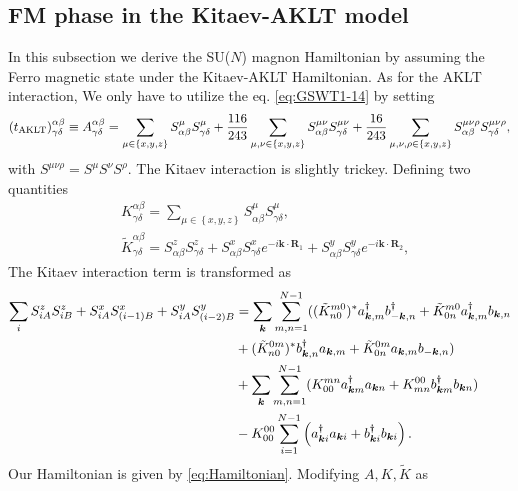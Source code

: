 \documentclass[11pt, aps, longbibliography]{article}
\begin{document}
\subsection{FM phase in the Kitaev-AKLT model}
In this subsection we derive the SU($N$) magnon Hamiltonian by assuming the Ferro magnetic state under the Kitaev-AKLT Hamiltonian.
As for the AKLT interaction, We only have to utilize the eq. \eqref{eq:GSWT1-14} by setting
\begin{equation}
    (t_{\rm AKLT})^{\alpha\beta}_{\gamma\delta}  \equiv A^{\alpha\beta}_{\gamma\delta} = \sum_{\mu\in \left\{ x,y,z \right\}} S^\mu_{\alpha\beta}S^\mu_{\gamma\delta} + \frac{116}{243}\sum_{\mu,\nu \in \left\{ x,y,z \right\}} S^{\mu\nu}_{\alpha\beta}S^{\mu\nu}_{\gamma\delta}  + \frac{16}{243}\sum_{\mu,\nu,\rho \in \left\{ x,y,z \right\}} S^{\mu\nu\rho}_{\alpha\beta}S^{\mu\nu\rho}_{\gamma\delta},
\end{equation}
with $S^{\mu\nu\rho} = S^{\mu}S^{\nu}S^{\rho}$.
The Kitaev interaction is slightly trickey.
Defining two quantities
\begin{align}
    &K^{\alpha\beta}_{\gamma\delta} =  \sum_{\mu\in \left\{ x,y,z \right\}}S^\mu_{\alpha\beta}S^\mu_{\gamma\delta}, \\
    &\tilde{K}^{\alpha\beta}_{\gamma\delta} = S^z_{\alpha\beta}S^z_{\gamma\delta} + S^x_{\alpha\beta}S^x_{\gamma\delta}e^{-i\bm{k}\cdot \bm{R}_1}  + S^y_{\alpha\beta}S^y_{\gamma\delta}e^{-i\bm{k}\cdot \bm{R}_2},
\end{align}
The Kitaev interaction term is transformed as
\begin{align}
    \sum_{i} S^z_{iA}S^z_{iB} + S^x_{iA}S^x_{(i-1)B}+ S^y_{iA}S^y_{(i-2)B}  &= \sum_{\bm{k}}\sum_{m,n=1}^{N-1}(  (\tilde{K}^{m0}_{n0})^* a_{\bm{k},m}^\dagger b_{-\bm{k},n}^\dagger + \tilde{K}^{m0}_{0n} a_{\bm{k},m}^\dagger b_{\bm{k},n}  \notag \\
    &+ (\tilde{K}^{0m}_{n0})^* b_{\bm{k},n}^\dagger a_{\bm{k},m} + \tilde{K}^{0m}_{0n} a_{\bm{k},m}  b_{-\bm{k},n}  ) \notag \\
    &+ \sum_{\bm{k}}\sum_{m,n=1}^{N-1} (K^{mn}_{00}a_{\bm{k}m}^\dagger a_{\bm{k}n} + K^{00}_{mn}b_{\bm{k}m}^\dagger b_{\bm{k}n}) \notag \\
    &- K^{00}_{00} \sum_{i=1}^{N-1} \left( a_{\bm{k}i}^\dagger a_{\bm{k}i} +b_{\bm{k}i}^\dagger b_{\bm{k}i} \right).
\end{align}
Our Hamiltonian is given by \eqref{eq:Hamiltonian}. Modifying $A,K,\tilde{K}$ as 
\end{document}
